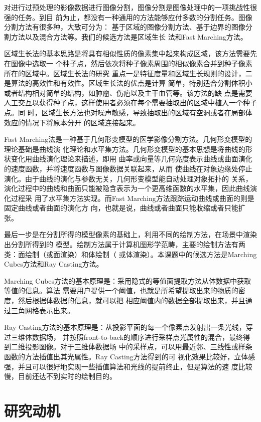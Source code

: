 对进行过预处理的影像数据进行图像分割，图像分割是图像处理中的一项挑战性很强的任务。到目
前为止，都没有一种通用的方法能够应付多数的分割任务。图像分割方法有很多种，大致可分为：
基于区域的图像分割方法、基于边界的图像分割方法以及混合方法等。我们的候选方法是区域生长
法和Fast Marching方法。

区域生长法的基本思路是将具有相似性质的像素集中起来构成区域，该方法需要先在图像中选取一
个种子点，然后依次将种子像素周围的相似像素合并到种子像素所在的区域中。区域生长法的研究
重点一是特征度量和区域生长规则的设计，二是算法的高效性和有效性。区域生长法的优点是计算
简单，特别适合分割体积小或者结构相对简单的结构，如肿瘤、伤疤以及主干血管等。该方法的缺
点是需要人工交互以获得种子点，这样使用者必须在每个需要抽取出的区域中植入一个种子点。同
时，区域生长方法也对噪声敏感，导致抽取出的区域有空洞或者在局部体效应的情况下将原本分开
的区域连接起来。

Fast Marching法是一种基于几何形变模型的医学影像分割方法。几何形变模型的理论基础是曲线演
化理论和水平集方法。几何形变模型的基本思想是将曲线的形状变化用曲线演化理论来描述，即用
曲率或向量等几何亮度表示曲线或曲面演化的速度函数，并将速度函数与图像数据关联起来，从而
使曲线在对象边缘处停止演化。由于曲线的演化与参数无关，几何形变模型能自动处理对象拓扑的
关系，演化过程中的曲线和曲面只能被隐含表示为一个更高维函数的水平集，因此曲线演化过程采
用了水平集方法实现。而Fast Marching方法跟踪运动曲线或曲面的则是固定曲线或者曲面的演化方
向，也就是说，曲线或者曲面只能收缩或者只能扩张。

最后一步是在分割所得的模型像素的基础上，利用不同的绘制方法，在场景中渲染出分割所得到的
模型。绘制方法属于计算机图形学范畴，主要的绘制方法有两类：面绘制（或面渲染）和体绘制（
或体渲染）。本课题中的候选方法是Marching Cubes方法和Ray Casting方法。

Marching Cubes方法的基本原理是：采用隐式的等值面提取方法从体数据中获取等值的信息。算法
需要用户提供一个阈值，也就是所希望提取出来的物质的密度，然后根据体数据的信息，就可以把
相应阈值内的数据全部提取出来，并且通过三角网格表示出来。

Ray Casting方法的基本原理是：从投影平面的每一个像素点发射出一条光线，穿过三维体数据场，
并按照front-to-back的顺序进行采样点光属性的混合，最终得到二维投影图像。对于三维体数据场
中的采样点，可以用最近邻、三线性或样条函数的方法插值出其光属性。Ray Casting方法得到的可
视化效果比较好，立体感强，并且可以很好地实现一些插值算法和光线的提前终止，但是算法的速
度比较慢，目前还达不到实时的绘制目的。

\section{研究动机}
\label{sec1-2}

